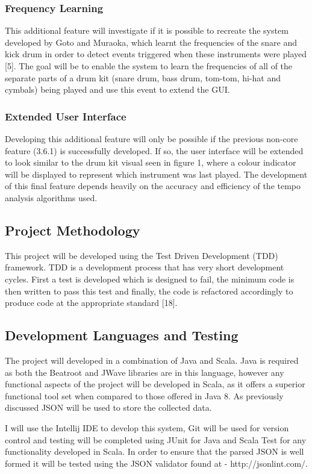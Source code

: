 \documentclass[a4paper, 11pt]{article}
\begin{document}
\subsubsection{Frequency Learning}
This additional feature will investigate if it is possible to recreate the system developed by Goto and Muraoka, which learnt the frequencies of the snare and kick drum in order to detect events triggered when these instruments were played [5]. The goal will be to enable the system to learn the frequencies of all of the separate parts of a drum kit (snare drum, bass drum, tom-tom, hi-hat and cymbals) being played and use this event to extend the GUI.

\subsubsection{Extended User Interface}
Developing this additional feature will only be possible if the previous non-core feature (3.6.1) is successfully developed. If so, the user interface will be extended to look similar to the drum kit visual seen in figure 1, where a colour indicator will be displayed to represent which instrument was last played. The development of this final feature depends heavily on the accuracy and efficiency of the tempo analysis algorithms used.

\subsection{Project Methodology}
This project will be developed using the Test Driven Development (TDD) framework. TDD is a development process that has very short development cycles. First a test is developed which is designed to fail, the minimum code is then written to pass this test and finally, the code is refactored accordingly to produce code at the appropriate standard [18].

\subsection{Development Languages and Testing}
The project will developed in a combination of Java and Scala. Java is required as both the Beatroot and JWave libraries are in this language, however any functional aspects of the project will be developed in Scala, as it offers a superior functional tool set when compared to those offered in Java 8. As previously discussed JSON will be used to store the collected data.

I will use the Intellij IDE to develop this system, Git will be used for version control and testing will be completed using JUnit for Java and Scala Test for any functionality developed in Scala. In order to ensure that the parsed JSON is well formed it will be tested using the JSON validator found at - http://jsonlint.com/.
\end{document}
